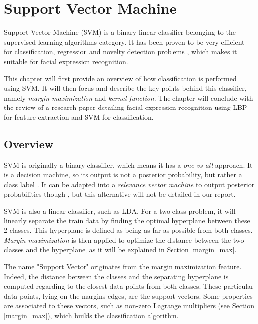 \chapter{Support Vector Machine}
\label{chap:svm}

\noindent Support Vector Machine (SVM) is a binary linear classifier belonging to the supervised learning algorithms category. It has been proven to be very efficient for classification, regression and novelty detection problems \cite{BIS06}, which makes it suitable for facial expression recognition.
\newline

\noindent This chapter will first provide an overview of how classification is performed using SVM. It will then focus and describe the key points behind this classifier, namely \textit{margin maximization} and \textit{kernel function}. The chapter will conclude with the review of a research paper detailing facial expression recognition using LBP for feature extraction and SVM for classification.
\newline

\section{Overview}
\label{svm_overview}

\vspace{\baselineskip}
\noindent SVM is originally a binary classifier, which means it has a \textit{one-vs-all} approach. It is a decision machine, so its output is not a posterior probability, but rather a class label \cite{BIS06}.  It can be adapted into a \textit{relevance vector machine} to output posterior probabilities though \cite{BIS06}, but this alternative will not be detailed in our report.
\newline

\noindent SVM is also a linear classifier, such as LDA. For a two-class problem, it will linearly separate the train data by finding the optimal hyperplane between these 2 classes. This hyperplane is defined as being as far as possible from both classes. \textit{Margin maximization} is then applied to optimize the distance between the two classes and the hyperplane, as it will be explained in Section \ref{margin_max}.
\newline

\noindent The name "Support Vector" originates from the margin maximization feature. Indeed, the distance between the classes and the separating hyperplane is computed regarding to the closest data points from both classes. These particular data points, lying on the margins edges, are the support vectors. Some properties are associated to these vectors, such as non-zero Lagrange multipliers (see Section \ref{margin_max}), which builds the classification algorithm.
\newline

